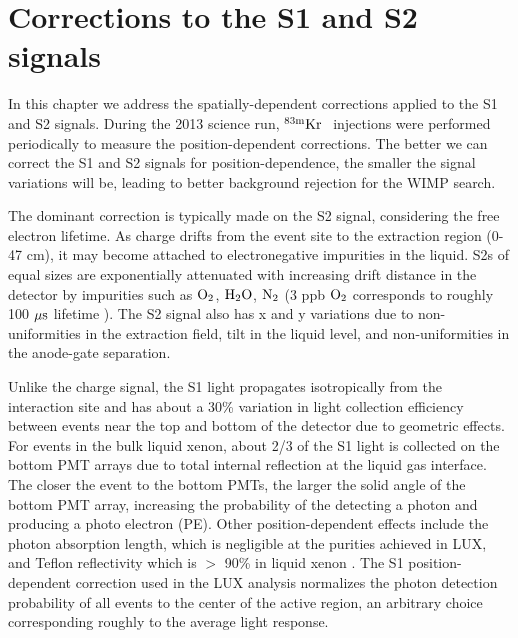 
\renewcommand{\thechapter}{3}
\newcommand{\KrCal}{$\rm^{83m}Kr \: $}
\newcommand{\Rb}{$\rm^{83}Rb \: $}

\chapter{Corrections to the S1 and S2 signals}
\label{Ch:3}

In this chapter we address the spatially-dependent corrections applied to the S1 and S2 signals. During the 2013 science run, \KrCal$\,$ injections were performed periodically to measure the position-dependent corrections. The better we can correct the S1 and S2 signals for position-dependence, the smaller the signal variations will be, leading to better background rejection for the WIMP search. 


The dominant correction is typically made on the S2 signal, considering the free electron lifetime. As charge drifts from the event site to the extraction region (0-47 cm), it may become attached to electronegative impurities in the liquid. S2s of equal sizes are exponentially attenuated with increasing drift distance in the detector by impurities such as $\rm O_2$, $\rm H_2O$, $\rm N_2$ (3 ppb $\rm O_2$ corresponds to roughly 100 $\rm \mu s$ lifetime \cite{GPM}). The S2 signal also has x and y variations due to non-uniformities in the extraction field, tilt in the liquid level, and non-uniformities in the anode-gate separation. 


Unlike the charge signal, the S1 light propagates isotropically from the interaction site and has about a 30\% variation in light collection efficiency between events near the top and bottom of the detector due to geometric effects. For events in the  bulk liquid xenon, about 2/3 of the S1 light is collected on the bottom PMT arrays due to total internal reflection at the liquid gas interface. The closer the event to the bottom PMTs, the larger the solid angle of the bottom PMT array, increasing the probability of the detecting a photon and producing a photo electron (PE). Other position-dependent effects include the photon absorption length, which is negligible at the purities achieved in LUX, and Teflon reflectivity which is $>$ 90\% in liquid xenon \cite{Teflon_R_1} \cite{Teflon_R_2}. The S1 position-dependent correction used in the LUX analysis normalizes the photon detection probability of all events to the center of the active region, an arbitrary choice corresponding roughly to the average light response.

